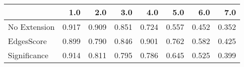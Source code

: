 \begin{tabular}{lrrrrrrr}
\toprule
{} &   1.0 &   2.0 &   3.0 &   4.0 &   5.0 &   6.0 &   7.0 \\
\midrule
No Extension & 0.917 & 0.909 & 0.851 & 0.724 & 0.557 & 0.452 & 0.352 \\
EdgesScore   & 0.899 & 0.790 & 0.846 & 0.901 & 0.762 & 0.582 & 0.425 \\
Significance & 0.914 & 0.811 & 0.795 & 0.786 & 0.645 & 0.525 & 0.399 \\
\bottomrule
\end{tabular}
